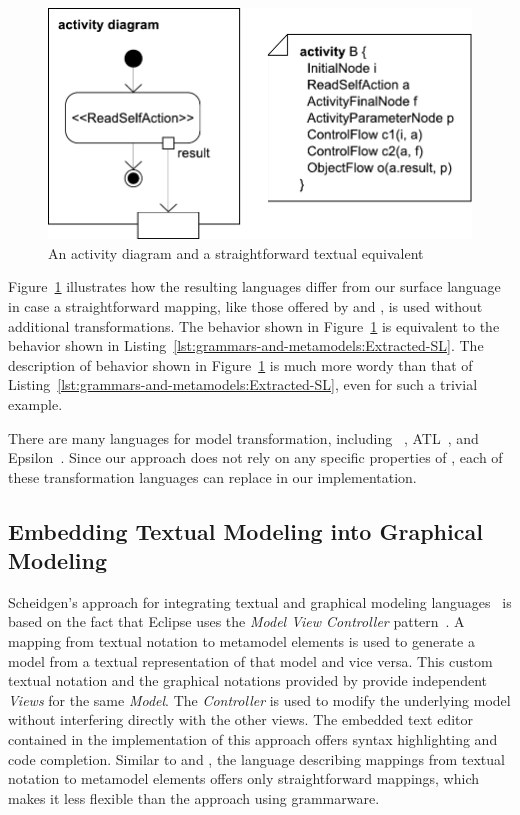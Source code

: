 \begin{figure}
\centering
\includegraphics[scale=0.5]{grammars-and-metamodels/figs/mapping-comparison}
\caption{An activity diagram and a straightforward textual equivalent}
\label{fig:grammars-and-metamodels:straightfwd}
\end{figure}

Figure~\ref{fig:grammars-and-metamodels:straightfwd} illustrates how the resulting languages differ from our surface language in case a straightforward mapping, like those offered by \Xtext and \TCS, is used without additional transformations.
The behavior shown in Figure~\ref{fig:grammars-and-metamodels:straightfwd} is equivalent to the behavior shown in Listing~\ref{lst:grammars-and-metamodels:Extracted-SL}.
The description of behavior shown in Figure~\ref{fig:grammars-and-metamodels:straightfwd} is much more wordy than that of Listing~\ref{lst:grammars-and-metamodels:Extracted-SL}, even for such a trivial example.

There are many languages for model transformation, including \QVT~\cite{QVTspec}, ATL~\cite{ATLqvt}, and Epsilon~\cite{conf/icmt/KolovosPP08}.
Since our approach does not rely on any specific properties of \Xtend, each of these transformation languages can replace \Xtend in our implementation.


\subsection{Embedding Textual Modeling into Graphical Modeling}
\label{sub:grammars-and-metamodels:related-Embedding}

Scheidgen's approach for integrating textual and graphical modeling languages~\cite{conf/ECMDA/Scheidgen08} is based on the fact that Eclipse uses the \emph{Model View Controller} pattern~\cite{reenskaug79}.
A mapping from textual notation to metamodel elements is used to generate a model from a textual representation of that model and vice versa.
This custom textual notation and the graphical notations provided by \Eclipse provide independent \emph{Views} for the same \emph{Model}.
The \emph{Controller} is used to modify the underlying model without interfering directly with the other views.
The embedded text editor contained in the implementation of this approach offers syntax highlighting and code completion.
Similar to \Xtext and \TCS, the language describing mappings from textual notation to metamodel elements offers only straightforward mappings, which makes it less flexible than the approach using grammarware. 
